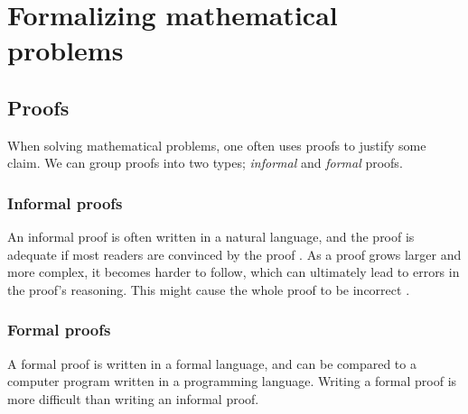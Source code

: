 \chapter{Formalizing mathematical problems}

\section{Proofs}

When solving mathematical problems, one often uses proofs
to justify some claim. We can group proofs into two types; \textit{informal} and \textit{formal} proofs.

\subsection{Informal proofs}
An informal proof is often written in a natural language, and the proof is adequate if most
readers are convinced by the proof \cite{bpierce}.
As a proof grows larger and more complex, it becomes harder to follow, which can
ultimately lead to errors in the proof's reasoning. This might cause the whole proof
to be incorrect \cite{rkhamsi}.

\subsection{Formal proofs}
A formal proof is written in a formal language, and can be compared to a computer program
written in a programming language. Writing a formal proof is more difficult than writing an informal proof.
